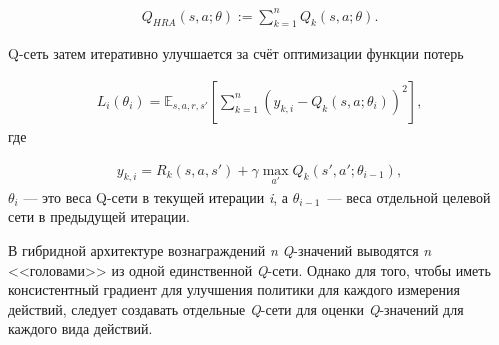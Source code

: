 \begin{equation}
    \begin{multlined}
        Q_{H R A}(s, a; \theta) := \sum^n_{k=1} Q_k(s, a;\theta).
    \end{multlined}
\end{equation}

Q-сеть затем итеративно улучшается за счёт оптимизации функции потерь

\begin{equation}
    \begin{multlined}
        L_i(\theta_i) = \mathbb{E}_{s, a, r, s'}[\sum^n_{k=1}(y_{k, i}-Q_k(s, a;\theta_i))^2],
    \end{multlined}
\end{equation}
где

\begin{equation}
    \begin{multlined}
        y_{k, i} = R_k(s, a, s') + \gamma \max_{a'} Q_k(s', a';\theta_{i-1}),
    \end{multlined}
\end{equation}
$\theta_i$ — это веса Q-сети в текущей итерации \textit{i}, а $\theta_{i-1}$~--- веса отдельной целевой сети в предыдущей итерации.

В гибридной архитектуре вознаграждений \textit{n} \textit{Q}-значений выводятся \textit{n} <<головами>> из одной единственной \textit{Q}-сети. Однако для того, чтобы иметь консистентный градиент для улучшения политики для каждого измерения действий, следует создавать отдельные \textit{Q}-сети для оценки \textit{Q}-значений для каждого вида действий.
